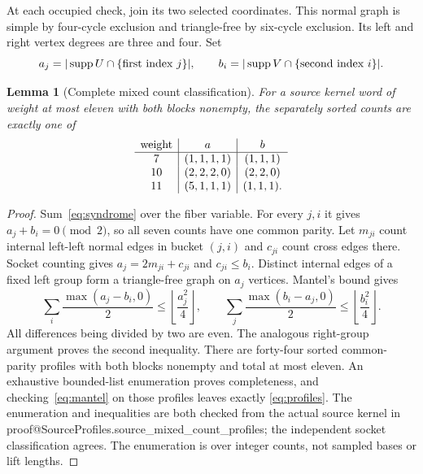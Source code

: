 \documentclass[11pt]{article}
\makeatletter
\newtheorem{lemma}[theorem]{Lemma}
\theoremstyle{definition}\newtheorem{definition}[theorem]{Definition}
\newcommand{\supp}{\operatorname{supp}}
\newcommand{\lean}[2]{\csname proof@#1.#2\endcsname}
\makeatother
\begin{document}
At each occupied check, join its two selected coordinates. This normal graph
is simple by four-cycle exclusion and triangle-free by six-cycle exclusion.
Its left and right vertex degrees are three and four. Set
\begin{equation}\label{eq:counts}
 a_j=|\supp U\cap\{\hbox{first index }j\}|,\qquad
 b_i=|\supp V\cap\{\hbox{second index }i\}|.
\end{equation}
\begin{lemma}[Complete mixed count classification]\label{lem:profiles}
For a source kernel word of weight at most eleven with both blocks nonempty,
the separately sorted counts are exactly one of
\begin{equation}\label{eq:profiles}
 \begin{array}{c|c|c}
 \hbox{weight}&a&b\\\hline
 7&(1,1,1,1)&(1,1,1)\\
 10&(2,2,2,0)&(2,2,0)\\
 11&(5,1,1,1)&(1,1,1).
 \end{array}
\end{equation}
\end{lemma}
\begin{proof}
Sum~\eqref{eq:syndrome} over the fiber variable. For every $j,i$ it gives
$a_j+b_i=0\pmod2$, so all seven counts have one common parity.
Let $m_{ji}$ count internal left-left normal edges in bucket $(j,i)$ and
$c_{ji}$ count cross edges there. Socket counting gives
$a_j=2m_{ji}+c_{ji}$ and $c_{ji}\leq b_i$. Distinct internal edges of a fixed
left group form a triangle-free graph on $a_j$ vertices. Mantel's bound gives
\begin{equation}\label{eq:mantel}
 \sum_i\frac{\max(a_j-b_i,0)}2\leq\left\lfloor\frac{a_j^2}4\right\rfloor,
 \qquad
 \sum_j\frac{\max(b_i-a_j,0)}2\leq\left\lfloor\frac{b_i^2}4\right\rfloor.
\end{equation}
All differences being divided by two are even. The analogous right-group
argument proves the second inequality.
There are forty-four sorted common-parity profiles with both blocks nonempty
and total at most eleven. An exhaustive bounded-list enumeration proves
completeness, and checking~\eqref{eq:mantel} on those profiles leaves exactly
\eqref{eq:profiles}. The enumeration and inequalities are both checked from
the actual source kernel in
\lean{SourceProfiles}{source_mixed_count_profiles}; the independent socket
classification agrees. The enumeration is over integer counts, not sampled
bases or lift lengths.
\end{proof}
\end{document}
